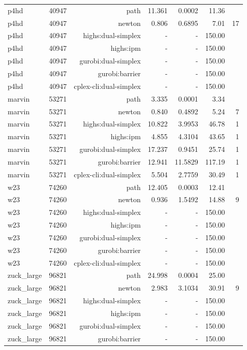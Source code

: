 \begin{longtable}{lrrrrrr}
p4hd & 40947 & path & 11.361 & 0.0002 & 11.36 &  \\
p4hd & 40947 & newton & 0.806 & 0.6895 & 7.01 & 17 \\
p4hd & 40947 & highs:dual-simplex & - & - & 150.00 &  \\
p4hd & 40947 & highs:ipm & - & - & 150.00 &  \\
p4hd & 40947 & gurobi:dual-simplex & - & - & 150.00 &  \\
p4hd & 40947 & gurobi:barrier & - & - & 150.00 &  \\
p4hd & 40947 & cplex-cli:dual-simplex & - & - & 150.00 &  \\
marvin & 53271 & path & 3.335 & 0.0001 & 3.34 &  \\
marvin & 53271 & newton & 0.840 & 0.4892 & 5.24 & 7 \\
marvin & 53271 & highs:dual-simplex & 10.822 & 3.9953 & 46.78 & 1 \\
marvin & 53271 & highs:ipm & 4.855 & 4.3104 & 43.65 & 1 \\
marvin & 53271 & gurobi:dual-simplex & 17.237 & 0.9451 & 25.74 & 1 \\
marvin & 53271 & gurobi:barrier & 12.941 & 11.5829 & 117.19 & 1 \\
marvin & 53271 & cplex-cli:dual-simplex & 5.504 & 2.7759 & 30.49 & 1 \\
w23 & 74260 & path & 12.405 & 0.0003 & 12.41 &  \\
w23 & 74260 & newton & 0.936 & 1.5492 & 14.88 & 9 \\
w23 & 74260 & highs:dual-simplex & - & - & 150.00 &  \\
w23 & 74260 & highs:ipm & - & - & 150.00 &  \\
w23 & 74260 & gurobi:dual-simplex & - & - & 150.00 &  \\
w23 & 74260 & gurobi:barrier & - & - & 150.00 &  \\
w23 & 74260 & cplex-cli:dual-simplex & - & - & 150.00 &  \\
zuck\_large & 96821 & path & 24.998 & 0.0004 & 25.00 &  \\
zuck\_large & 96821 & newton & 2.983 & 3.1034 & 30.91 & 9 \\
zuck\_large & 96821 & highs:dual-simplex & - & - & 150.00 &  \\
zuck\_large & 96821 & highs:ipm & - & - & 150.00 &  \\
zuck\_large & 96821 & gurobi:dual-simplex & - & - & 150.00 &  \\
zuck\_large & 96821 & gurobi:barrier & - & - & 150.00 &  \\

\end{longtable}
